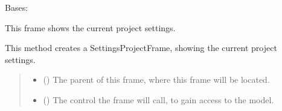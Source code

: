\documentclass[letterpaper,10pt,english]{sphinxmanual}
\begin{document}
\begin{fulllineitems}
\label{\detokenize{apidoc/src.osm_configurator.view.utilityframes:src.osm_configurator.view.utilityframes.settings_project_frame.SettingsProjectFrame}}
\pysigstartsignatures
{}
\pysigstopsignatures
\sphinxAtStartPar
Bases: 

\sphinxAtStartPar
This frame shows the current project settings.

\begin{fulllineitems}
\label{\detokenize{apidoc/src.osm_configurator.view.utilityframes:src.osm_configurator.view.utilityframes.settings_project_frame.SettingsProjectFrame.__init__}}
\pysigstartsignatures
{}
\pysigstopsignatures
\sphinxAtStartPar
This method creates a SettingsProjectFrame, showing the current project settings.
\begin{quote}\begin{description}
\begin{itemize}
\item {} 
\sphinxAtStartPar
{} ({\hyperref[\detokenize{apidoc/src.osm_configurator.view.toplevelframes:src.osm_configurator.view.toplevelframes.settings_frame.SettingsFrame}]{}}) \textendash{} The parent of this frame, where this frame will be located.

\item {} 
\sphinxAtStartPar
{} ({\hyperref[\detokenize{apidoc/src.osm_configurator.control:src.osm_configurator.control.control_interface.IControl}]{}}) \textendash{} The control the frame will call, to gain access to the model.

\end{itemize}

\end{description}\end{quote}


\end{fulllineitems}
\end{fulllineitems}
\end{document}
